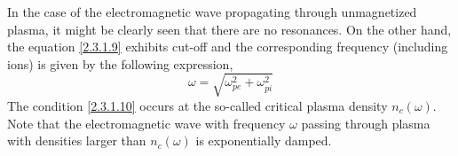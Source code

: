 In the case of the electromagnetic wave propagating through unmagnetized plasma, it might be clearly seen that there are no resonances. On the other hand, the equation \ref{2.3.1.9} exhibits cut-off and the corresponding frequency (including ions) is given by the following expression,
\begin{equation}
\label{2.3.1.10}
\omega = \sqrt{\omega_{pe}^{2} + \omega_{pi}^{2}}
\end{equation}
The condition \ref{2.3.1.10} occurs at the so-called critical plasma density $ n_c \left( \omega\right) $. Note that the electromagnetic wave with frequency $ \omega $ passing through plasma with densities larger than $ n_c \left( \omega\right) $ is exponentially damped.